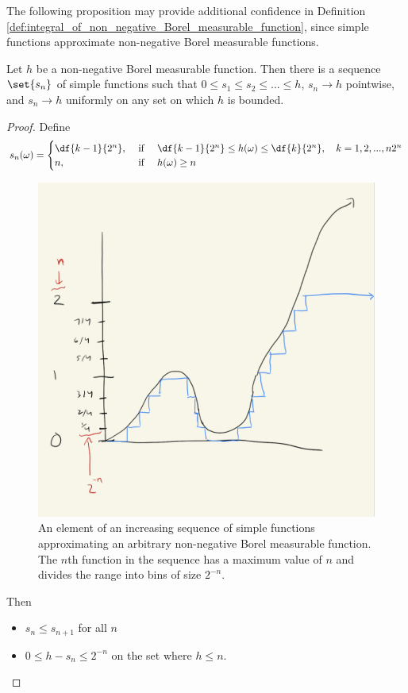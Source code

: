 \documentclass{article} %
\begin{document}

The following proposition may provide additional confidence in Definition \ref{def:integral_of_non_negative_Borel_measurable_function}, since simple functions approximate non-negative Borel measurable functions.

\begin{proposition}
Let $h$ be a non-negative Borel measurable function.  Then there is a sequence $\set{s_n}$ of simple functions such that $0 \leq s_1 \leq s_2 \leq ... \leq h$, $s_n \to h$ pointwise, and $s_n \to h$ uniformly on any set on which $h$ is bounded.	
\label{prop:there_is_a_sequence_of_simple_fucntions_that_increases_to_any_non_negative_borel_measurable_function}
\end{proposition}

\begin{proof}
Define 
\[ s_n(\omega) = 
\begin{cases}
\df{k-1}{2^n}, & \text{ if } \quad \df{k-1}{2^n} \leq h(\omega) \leq \df{k}{2^n},\quad k=1,2,...,n2^n \\
n, & \text{ if } \quad h(\omega) \geq n 
\end{cases}
\]	

\begin{figure}[H]
\centering
\includegraphics[width=.7\textwidth]{images/approximate_nonnegative_with_simple}	
\caption{An element of an increasing sequence of simple functions approximating an arbitrary non-negative Borel measurable function. The $n$th function in the sequence has a maximum value of $n$ and divides the range into bins of size $2^{-n}$.}
\end{figure}


Then 
\begin{itemize}
\item $s_n \leq s_{n+1}$ for all $n$
\item $0 \leq h - s_n \leq 2^{-n}$ on the set where $h \leq n$.
\end{itemize}
\end{proof}
\end{document}
